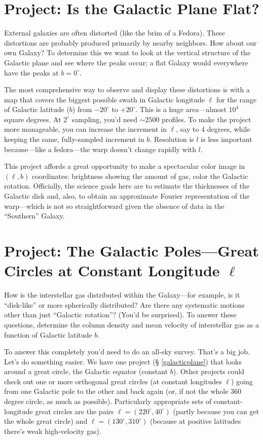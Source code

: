\documentclass[psfig,preprint]{aastex}
\begin{document}
\section{Project: Is the Galactic Plane Flat?}

\noindent
External galaxies are often distorted (like the brim of a Fedora). 
These distortions are probably produced primarily by nearby neighbors. 
How about our own Galaxy? To determine this we want to look at the
vertical structure of the Galactic plane and see where the peaks occur;
a flat Galaxy would everywhere have the peaks at $b=0^\circ$. 

The most comprehensive way to observe and display these distortions is
with a map that covers the biggest possible swath in Galactic longitude
$\ell$ for the range of Galactic latitude ($b$) from $-20^\circ$ to
$+20^\circ$. This is a huge area---almost $10^4$ square degrees. At
$2^\circ$ sampling, you'd need $\sim 2500$ profiles.  To make the
project more manageable, you can increase the increment in $\ell$, say
to 4 degrees, while keeping the same, fully-sampled increment in
$b$. Resolution is $l$ is less important because---like a
fedora---the warp doesn't change rapidly with $l$.

This project affords a great opportunity to make a spectacular color
image in $(\ell,b)$ coordinates: brightness showing the amount of gas,
color the Galactic rotation.  Officially, the science goals here are to
estimate the thicknesses of the Galactic disk and, also, to obtain an
approximate Fourier representation of the warp---which is not so
straightforward given the absence of data in the ``Southern'' Galaxy.

\section{Project: The Galactic Poles---Great Circles at Constant Longitude $\ell$}
\label{galacticpoles}

\noindent
How is the interstellar gas distributed within the Galaxy---for example,
is it ``disk-like'' or more spherically distributed? Are there any
systematic motions other than just ``Galactic rotation''? (You'd be
surprised).  To answer these questions, determine the column density
and mean velocity of interstellar gas as a function of Galactic latitude
$b$. 

	To answer this completely you'd need to do an all-sky survey. That's
a big job.  Let's do something easier. We have one project (\S
\ref{galacticplane}) that looks around a great circle, the Galactic
equator (constant $b$). Other projects could check out one or more
orthogonal great circles (at constant longitudes $\ell$) going from one
Galactic pole to the other and back again (or, if not the whole 360
degree circle, as much as possible).  Particularly appropriate sets of
constant-longitude great circles are the pairs $\ell = (220^\circ,
40^\circ)$ (partly because you can get the whole great circle) and $\ell
= (130^\circ, 310^\circ)$ (because at positive latitudes there's weak
high-velocity gas).
\end{document}

